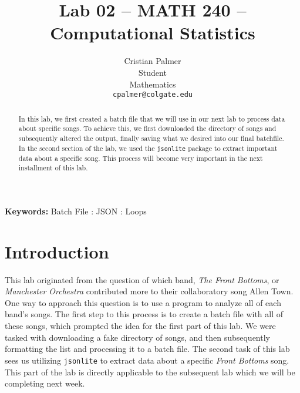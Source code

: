 \documentclass{article}\usepackage[]{graphicx}\usepackage[]{xcolor}
\begin{document}
\vspace{-1in}
\title{Lab 02 -- MATH 240 -- Computational Statistics}

\author{
  Cristian Palmer \\
  Student  \\
  Mathematics  \\
  {\tt cpalmer@colgate.edu}
}

\date{}

\maketitle

\begin{multicols}{2}
\begin{abstract}
In this lab, we first created a batch file that we will use in our next lab to process data about specific songs. To achieve this, we first downloaded the directory of songs and subsequently altered the output, finally saving what we desired into our final batchfile. In the second section of the lab, we used the \texttt{jsonlite} package to extract important data about a specific song. This process will become very important in the next installment of this lab.   
\end{abstract}

\noindent \textbf{Keywords:} Batch File : JSON : Loops

\section{Introduction}
This lab originated from the question of which band,  \textit{The Front Bottoms}, or \textit{Manchester Orchestra} contributed more to their collaboratory song Allen Town. One way to approach this question is to use a program to analyze all of each band's songs. The first step to this process is to create a batch file with all of these songs, which prompted the idea for the first part of this lab. We were tasked with downloading a fake directory of songs, and then subsequently formatting the list and processing it to a batch file. The second task of this lab sees us utilizing \texttt{jsonlite} to extract data about a specific \textit{Front Bottoms} song. This part of the lab is directly applicable to the subsequent lab which we will be completing next week.


\end{multicols}
\end{document}
